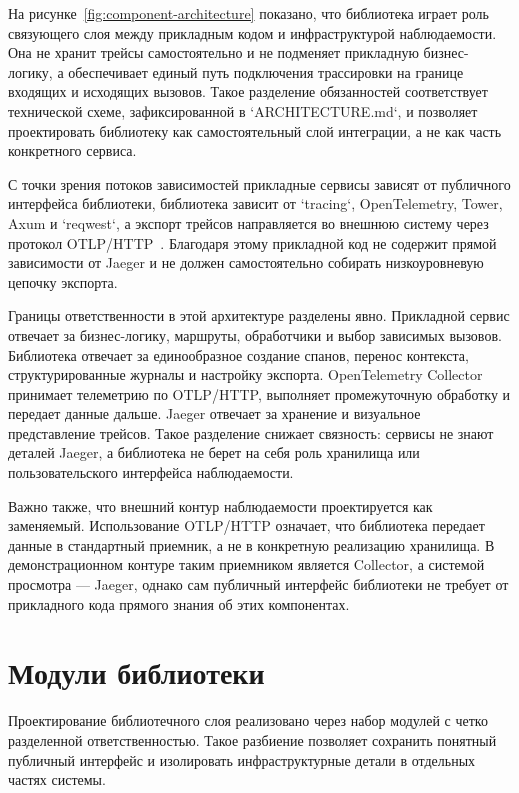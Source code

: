 На рисунке~\ref{fig:component-architecture} показано, что библиотека играет роль
связующего слоя между прикладным кодом и инфраструктурой наблюдаемости. Она не
хранит трейсы самостоятельно и не подменяет прикладную бизнес-логику, а
обеспечивает единый путь подключения трассировки на границе входящих и исходящих
вызовов. Такое разделение обязанностей соответствует технической схеме,
зафиксированной в `ARCHITECTURE.md`, и позволяет проектировать библиотеку как
самостоятельный слой интеграции, а не как часть конкретного сервиса.

С точки зрения потоков зависимостей прикладные сервисы зависят от публичного
интерфейса библиотеки, библиотека зависит от `tracing`, OpenTelemetry, Tower,
Axum и `reqwest`, а экспорт трейсов направляется во внешнюю систему через протокол
OTLP/HTTP~\cite{otlpSpec,otlpExporterSpec}. Благодаря этому прикладной код не
содержит прямой зависимости от Jaeger и не должен самостоятельно собирать
низкоуровневую цепочку экспорта.

Границы ответственности в этой архитектуре разделены явно. Прикладной сервис
отвечает за бизнес-логику, маршруты, обработчики и выбор зависимых вызовов.
Библиотека отвечает за единообразное создание спанов, перенос контекста,
структурированные журналы и настройку экспорта. OpenTelemetry Collector принимает
телеметрию по OTLP/HTTP, выполняет промежуточную обработку и передает данные
дальше. Jaeger отвечает за хранение и визуальное представление трейсов. Такое
разделение снижает связность: сервисы не знают деталей Jaeger, а библиотека не
берет на себя роль хранилища или пользовательского интерфейса наблюдаемости.

Важно также, что внешний контур наблюдаемости проектируется как заменяемый.
Использование OTLP/HTTP означает, что библиотека передает данные в стандартный
приемник, а не в конкретную реализацию хранилища. В демонстрационном контуре
таким приемником является Collector, а системой просмотра --- Jaeger, однако
сам публичный интерфейс библиотеки не требует от прикладного кода прямого знания
об этих компонентах.

\section{Модули библиотеки}

Проектирование библиотечного слоя реализовано через набор модулей с четко
разделенной ответственностью. Такое разбиение позволяет сохранить понятный
публичный интерфейс и изолировать инфраструктурные детали в отдельных частях
системы.

